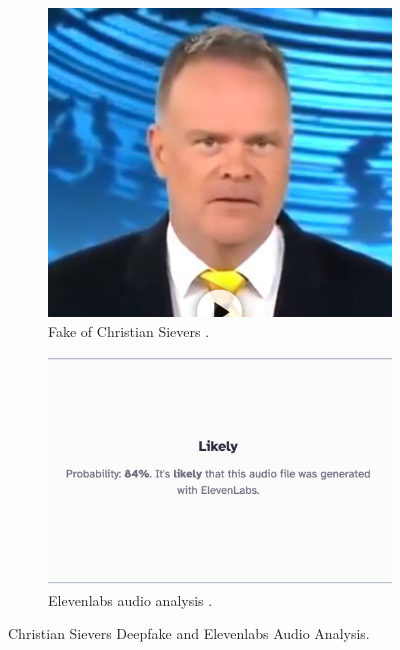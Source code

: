 \documentclass[
  a4paper,  %
  twoside,  %
  bibliography=totoc,
  headsepline,
  cleardoublepage=empty,
  parskip=half,
  draft=false
]{scrbook}
\begin{document}
\begin{figure}[h]
  \centering
  \begin{subfigure}[b]{0.45\textwidth}
    \includegraphics[width=\textwidth]{./graphics/sievers.png}
    \caption{Fake of Christian Sievers \cite{zdfDeepfakeMitZDFModerator2023}.}
    \label{fig:sievers-fake}
  \end{subfigure}
  \hfill
  \begin{subfigure}[b]{0.5\textwidth}
    \includegraphics[width=\textwidth]{./graphics/sievers-11labs.png}
    \caption{Elevenlabs audio analysis \cite{elevenlabsAISpeechClassifier}.}
    \label{fig:sievers-11labs}
  \end{subfigure}
  \caption{Christian Sievers Deepfake and Elevenlabs Audio Analysis.}
\end{figure}
\end{document}
